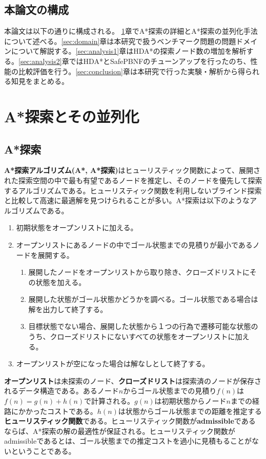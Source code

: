 \documentclass[uplatex]{jsarticle}
\begin{document}
\subsection{本論文の構成}

本論文は以下の通りに構成される。
\ref{sec:define}章でA*探索の詳細とA*探索の並列化手法について述べる。\ref{sec:domain}章は本研究で扱うベンチマーク問題の問題ドメインについて解説する。\ref{sec:analysis1}章はHDA*の探索ノード数の増加を解析する。\ref{sec:analysis2}章ではHDA*とSafePBNFのチューンアップを行ったのち、性能の比較評価を行う。\ref{sec:conclusion}章は本研究で行った実験・解析から得られる知見をまとめる。
\newpage

\section{A*探索とその並列化}
\label{sec:define}
\subsection{A*探索}

\textbf{A*探索アルゴリズム(A*, A*探索)}はヒューリスティック関数によって、展開された探索空間の中で最も有望であるノードを推定し、そのノードを優先して探索するアルゴリズムである\cite{Hart1968}。ヒューリスティック関数を利用しないブラインド探索と比較して高速に最適解を見つけられることが多い。A*探索は以下のようなアルゴリズムである。

\begin{enumerate}
	\item 初期状態をオープンリストに加える。
	\item オープンリストにあるノードの中でゴール状態までの見積りが最小であるノードを展開する。
	\begin{enumerate}
		\item 展開したノードをオープンリストから取り除き、クローズドリストにその状態を加える。
		\item 展開した状態がゴール状態かどうかを調べる。ゴール状態である場合は解を出力して終了する。
		\item 目標状態でない場合、展開した状態から１つの行為で遷移可能な状態のうち、クローズドリストにないすべての状態をオープンリストに加える。
	\end{enumerate}
	\item オープンリストが空になった場合は解なしとして終了する。
\end{enumerate}

\textbf{オープンリスト}は未探索のノード、\textbf{クローズドリスト}は探索済のノードが保存されるデータ構造である。あるノード$n$からゴール状態までの見積り$f(n)$は$f(n) = g(n) + h(n)$で計算される。$g(n)$は初期状態からノード$n$までの経路にかかったコストである。$h(n)$は状態からゴール状態までの距離を推定する\textbf{ヒューリスティック関数}である。ヒューリスティック関数が\textbf{admissible}であるならば、A*探索の解の最適性が保証される。ヒューリスティック関数がadmissibleであるとは、ゴール状態までの推定コストを過小に見積もることがないということである。
\newline
\end{document}
